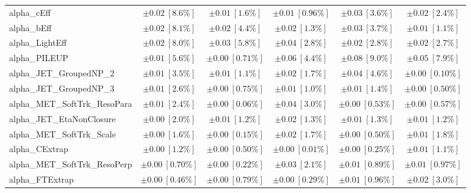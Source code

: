 \begin{sidewaystable}
\begin{center}
\begin{tabular*}{\textwidth}{@{\extracolsep{\fill}}lccccc}
alpha\_cEff         & $\pm 0.02\ [8.6\%] $          & $\pm 0.01\ [1.6\%] $          & $\pm 0.01\ [0.96\%] $          & $\pm 0.03\ [3.6\%] $          & $\pm 0.02\ [2.4\%] $       \\
alpha\_bEff         & $\pm 0.02\ [8.1\%] $          & $\pm 0.02\ [4.4\%] $          & $\pm 0.02\ [1.3\%] $          & $\pm 0.03\ [3.7\%] $          & $\pm 0.01\ [1.1\%] $       \\
alpha\_LightEff         & $\pm 0.02\ [8.0\%] $          & $\pm 0.03\ [5.8\%] $          & $\pm 0.04\ [2.8\%] $          & $\pm 0.02\ [2.8\%] $          & $\pm 0.02\ [2.7\%] $       \\
alpha\_PILEUP         & $\pm 0.01\ [5.6\%] $          & $\pm 0.00\ [0.71\%] $          & $\pm 0.06\ [4.4\%] $          & $\pm 0.08\ [9.0\%] $          & $\pm 0.05\ [7.9\%] $       \\
alpha\_JET\_GroupedNP\_2         & $\pm 0.01\ [3.5\%] $          & $\pm 0.01\ [1.1\%] $          & $\pm 0.02\ [1.7\%] $          & $\pm 0.04\ [4.6\%] $          & $\pm 0.00\ [0.10\%] $       \\
alpha\_JET\_GroupedNP\_3         & $\pm 0.01\ [2.6\%] $          & $\pm 0.00\ [0.75\%] $          & $\pm 0.01\ [1.0\%] $          & $\pm 0.01\ [1.4\%] $          & $\pm 0.00\ [0.50\%] $       \\
alpha\_MET\_SoftTrk\_ResoPara         & $\pm 0.01\ [2.4\%] $          & $\pm 0.00\ [0.06\%] $          & $\pm 0.04\ [3.0\%] $          & $\pm 0.00\ [0.53\%] $          & $\pm 0.00\ [0.57\%] $       \\
alpha\_JET\_EtaNonClosure         & $\pm 0.00\ [2.0\%] $          & $\pm 0.01\ [1.2\%] $          & $\pm 0.02\ [1.3\%] $          & $\pm 0.01\ [1.3\%] $          & $\pm 0.01\ [1.2\%] $       \\
alpha\_MET\_SoftTrk\_Scale         & $\pm 0.00\ [1.6\%] $          & $\pm 0.00\ [0.15\%] $          & $\pm 0.02\ [1.7\%] $          & $\pm 0.00\ [0.50\%] $          & $\pm 0.01\ [1.8\%] $       \\
alpha\_CExtrap         & $\pm 0.00\ [1.2\%] $          & $\pm 0.00\ [0.50\%] $          & $\pm 0.00\ [0.01\%] $          & $\pm 0.00\ [0.25\%] $          & $\pm 0.01\ [1.1\%] $       \\
alpha\_MET\_SoftTrk\_ResoPerp         & $\pm 0.00\ [0.70\%] $          & $\pm 0.00\ [0.22\%] $          & $\pm 0.03\ [2.1\%] $          & $\pm 0.01\ [0.89\%] $          & $\pm 0.01\ [0.97\%] $       \\
alpha\_FTExtrap         & $\pm 0.00\ [0.46\%] $          & $\pm 0.00\ [0.79\%] $          & $\pm 0.00\ [0.29\%] $          & $\pm 0.01\ [0.96\%] $          & $\pm 0.02\ [3.0\%] $       \\

\end{tabular*}
\end{center}
\end{sidewaystable}
